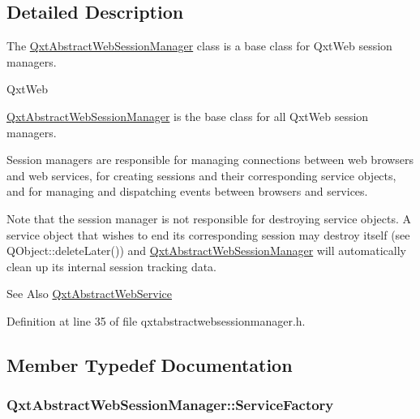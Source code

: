 \subsection{Detailed Description}
The \hyperlink{class_qxt_abstract_web_session_manager}{Qxt\-Abstract\-Web\-Session\-Manager} class is a base class for Qxt\-Web session managers. 

Qxt\-Web

\hyperlink{class_qxt_abstract_web_session_manager}{Qxt\-Abstract\-Web\-Session\-Manager} is the base class for all Qxt\-Web session managers.

Session managers are responsible for managing connections between web browsers and web services, for creating sessions and their corresponding service objects, and for managing and dispatching events between browsers and services.

Note that the session manager is not responsible for destroying service objects. A service object that wishes to end its corresponding session may destroy itself (see Q\-Object\-::delete\-Later()) and \hyperlink{class_qxt_abstract_web_session_manager}{Qxt\-Abstract\-Web\-Session\-Manager} will automatically clean up its internal session tracking data.

\begin{DoxySeeAlso}{See Also}
\hyperlink{class_qxt_abstract_web_service}{Qxt\-Abstract\-Web\-Service} 
\end{DoxySeeAlso}


Definition at line 35 of file qxtabstractwebsessionmanager.\-h.



\subsection{Member Typedef Documentation}
\hypertarget{class_qxt_abstract_web_session_manager_a7f507ee9b5b2c24ba2400258fa1a5f81}{
\subsubsection[{Service\-Factory}]{\setlength{\rightskip}{0pt plus 5cm}Qxt\-Abstract\-Web\-Session\-Manager\-::\-Service\-Factory}}\label{class_qxt_abstract_web_session_manager_a7f507ee9b5b2c24ba2400258fa1a5f81}


